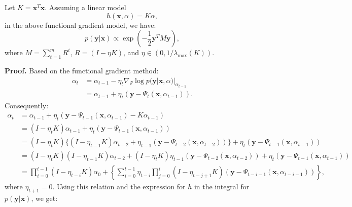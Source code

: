 	\begin{lemma}
		Let $K = \mathbf{x}^T \mathbf{x}$. Assuming a linear model
		\begin{equation}
			h(\mathbf{x}, \alpha) = K \alpha,
		\end{equation}
		in the above functional gradient model, we have:
		\begin{equation}
			p(\mathbf{y}|\mathbf{x}) \propto \exp\left( -\frac{1}{2} \mathbf{y}^T M \mathbf{y} \right),
		\end{equation}
		where $M = \sum_{t=1}^{m} R^t$, $R = (I - \eta K)$, and $\eta \in (0, 1 / \lambda_{\max}(K))$.
	\end{lemma}
	
	\textbf{Proof.} Based on the functional gradient method:
	\begin{align}
		\alpha_t &= \alpha_{t-1} - \eta_t \nabla_\Psi \log p(\mathbf{y}|\mathbf{x}, \alpha)|_{\alpha_{t-1}} \\
		&= \alpha_{t-1} + \eta_t (\mathbf{y} - \Psi_t(\mathbf{x}, \alpha_{t-1})).
	\end{align}
	Consequently:
	\begin{align}
		\alpha_t &= \alpha_{t-1} + \eta_t (\mathbf{y} - \Psi_{t-1}(\mathbf{x}, \alpha_{t-1}) - K \alpha_{t-1}) \\
		&= (I - \eta_t K) \alpha_{t-1} + \eta_t (\mathbf{y} - \Psi_{t-1}(\mathbf{x}, \alpha_{t-1})) \\
		&= (I - \eta_t K) \{ (I - \eta_{t-1} K) \alpha_{t-2} + \eta_{t-1} (\mathbf{y} - \Psi_{t-2}(\mathbf{x}, \alpha_{t-2})) \} + \eta_t (\mathbf{y} - \Psi_{t-1}(\mathbf{x}, \alpha_{t-1})) \\
		&= (I - \eta_t K)(I - \eta_{t-1} K) \alpha_{t-2} + (I - \eta_t K) \eta_{t-1} (\mathbf{y} - \Psi_{t-2}(\mathbf{x}, \alpha_{t-2})) + \eta_t (\mathbf{y} - \Psi_{t-1}(\mathbf{x}, \alpha_{t-1})) \\
		&= \prod_{i=0}^{t-1} (I - \eta_{t-i} K) \alpha_0 + \left\{ \sum_{i=0}^{t-1} \eta_{t-i} \prod_{j=0}^{i} (I - \eta_{t-j+1} K) (\mathbf{y} - \Psi_{t-i-1}(\mathbf{x}, \alpha_{t-i-1})) \right\},
	\end{align}
	where $\eta_{t+1} = 0$. Using this relation and the expression for $h$ in the integral for $p(\mathbf{y}|\mathbf{x})$, we get:
